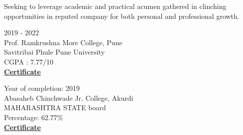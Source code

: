 \documentclass[letterpaper,10pt]{memoir} %
\begin{document}
\userinformation %

\framebreak %






{Seeking to leverage academic and practical acumen gathered in clinching opportunities in reputed company for both personal and professional growth.}\\





{2019 - 2022}\\
{Prof. Ramkrushna More College, Pune}\\
{Savitribai Phule Pune University}\\
CGPA : 7.77/10\\
\textbf{\href{https://drive.google.com/file/d/1xuLbI-bSOv9T8_0WRqHWHrbi1u2JjR_w/view}{Certificate}}\\





{Year of completion: 2019}\\
{Abasaheb Chinchwade Jr. College, Akurdi}\\
{MAHARASHTRA STATE board}\\
Percentage: 62.77\% \\
\textbf{\href{https://drive.google.com/file/d/1CjJB8hBzaGvziPmWkTyKk6KzM3dx-W_f/view}{Certificate}}\\
\end{document}
